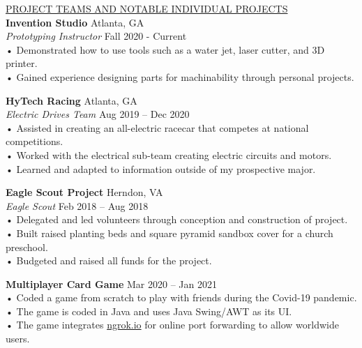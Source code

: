 \documentclass{article}
\begin{document}
\underline{\Large P\normalsize ROJECT TEAMS AND NOTABLE INDIVIDUAL PROJECTS\qquad\qquad\qquad\qquad\qquad\qquad\qquad\qquad\qquad\qquad\qquad\qquad\qquad\qquad\qquad\qquad\qquad\qquad\qquad\qquad\quad}\\                     

\large\textbf{Invention Studio} \hfill Atlanta, GA\\
\large \textit{Prototyping Instructor} \hfill Fall 2020 - Current\\
\qquad • \quad Demonstrated how to use tools such as a water jet, laser cutter, and 3D printer.\\
\qquad • \quad Gained experience designing parts for machinability through personal projects.
\vspace{3mm} %

\large\textbf{HyTech Racing}    \hfill Atlanta, GA\\
\large\textit{Electric Drives Team} \hfill Aug 2019 – Dec 2020\\
\qquad • \quad Assisted in creating an all-electric racecar that competes at national competitions.\\
\qquad • \quad Worked with the electrical sub-team creating electric circuits and motors.\\
\qquad • \quad Learned and adapted to information outside of my prospective major.\\
\vspace{3mm} %

\large\textbf{Eagle Scout Project}  \hfill Herndon, VA\\
\large\textit{Eagle Scout} \hfill Feb 2018 – Aug 2018\\
\qquad • \quad Delegated and led volunteers through conception and construction of project.\\
\qquad • \quad Built raised planting beds and square pyramid sandbox cover for a church preschool.\\
\qquad • \quad Budgeted and raised all funds for the project.\\
\vspace{3mm} %

\large\textbf{Multiplayer Card Game} \hfill Mar 2020 – Jan 2021\\
\qquad • \quad Coded a game from scratch to play with friends during the Covid-19 pandemic.\\
\qquad • \quad The game is coded in Java and uses Java Swing/AWT as its UI.\\
\qquad • \quad The game integrates \href{https://ngrok.com/}{ngrok.io} for online port forwarding to allow worldwide users.\\
\vspace{3mm} %
\end{document}
